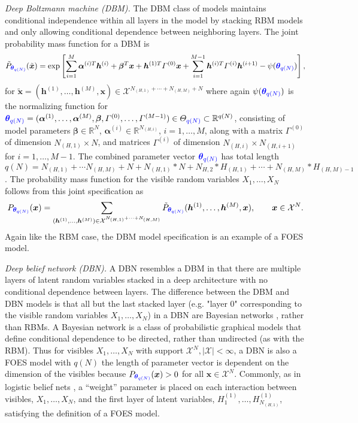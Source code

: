 \documentclass[numbib]{imamat}
\theoremstyle{theorem}
\theoremstyle{lemma}
\theoremstyle{example}
\theoremstyle{corollary}
\theoremstyle{definition}
\theoremstyle{remark}
\theoremstyle{approximation}
\theoremstyle{scheme}
\newcommand{\thetaidx}{q(N)}
\newcommand{\thetaN}{\boldsymbol \theta_{\thetaidx}}
\newcommand{\ak}[1]{{\color{blue} #1}}
\begin{document}
\noindent \emph{Deep Boltzmann machine (DBM).} The DBM class of models maintains conditional independence within all layers in the model by stacking RBM models and only allowing conditional dependence between neighboring layers. The joint probability mass function for a DBM is
\[
\tilde{P}_{\ak{\thetaN}} ( \tilde{\boldsymbol x} ) = \exp\left[ \sum\limits_{i = 1}^M\boldsymbol \alpha^{(i)T} \boldsymbol h^{(i)} + \boldsymbol \beta^T \boldsymbol x + \boldsymbol h^{(1)T} \Gamma^{(0)} \boldsymbol x + \sum\limits_{i = 1}^{M - 1} \boldsymbol h^{(i)T} \Gamma^{(i)} \boldsymbol h^{(i + 1)} - \psi(\ak{\thetaN}) \right],
\]
for \(\tilde{\boldsymbol x} = (\boldsymbol h^{(1)}, \dots, \boldsymbol h^{(M)}, \boldsymbol x) \in \mathcal{X}^{N_{(H,1)} + \cdots + N_{(H,M)} +N}\) \ak{where again $\psi(\ak{\thetaN})$}
is the normalizing function for \(\ak{\thetaN} = (\boldsymbol \alpha^{(1)}, \dots, \boldsymbol \alpha^{(M)}, \boldsymbol \beta,\Gamma^{(0)}, \dots, \Gamma^{(M - 1)}) \in \Theta_\ak{\thetaidx} \subset \mathbb{R}^{q(N)}\), consisting of model parameters \(\boldsymbol \beta \in \mathbb{R}^N\), \(\boldsymbol \alpha^{(i)} \in \mathbb{R}^{N_{(H,i)}}\), \(i = 1, \dots, M\), along with a matrix \(\Gamma^{(0)}\) of dimension \(N_{(H,1)} \times N\), and matrices \(\Gamma^{(i)}\) of dimension
\(N_{(H,i)} \times N_{(H,i+1)}\) for \(i = 1, \dots, M-1\). The combined parameter vector \(\ak{\thetaN}\) has total length \(q(N)= N_{(H,1)}+\cdots N_{(H,M)} + N + N_{(H,1)}*N+N_{H,2}*H_{(H,1)}+\cdots +N_{(H,M)}*H_{(H,M)-1}\). The probability mass function for the visible random variables \(X_1, \dots, X_N\) follows from this joint specification as
\[
P_{\ak{\thetaN}} (\boldsymbol x) = \sum\limits_{(\boldsymbol h^{(1)}, \dots, \boldsymbol h^{(M)}) \in \mathcal{X}^{N_{(H,1)} + \cdots + N_{(H,M)}}} \tilde{P}_{\ak{\thetaN}} (\boldsymbol h^{(1)}, \dots, \boldsymbol h^{(M)}, \boldsymbol x) , \qquad \boldsymbol x \in \mathcal{X}^N.
\]
Again like the RBM case, the DBM model specification is an example of a FOES model.

\noindent \emph{Deep belief network (DBN).} A DBN resembles a DBM in that there are multiple layers of latent random variables stacked in a deep architecture with no conditional dependence between layers. The difference between the DBM and DBN models is that all but the last stacked layer \ak{(e.g. "layer $0$" corresponding to the visible random variables $X_1, \dots, X_N$)} in a DBN are Bayesian networks \citep[see][]{pearl985bayesian}, rather than RBMs. A Bayesian network \ak{is a class of probabilistic graphical models that define} conditional dependence to be directed, rather than undirected (as with the RBM). Thus for visibles \(X_1, \dots, X_N\) with support \(\mathcal{X}^N, \mid \mathcal{X} \mid < \infty\), a DBN is also a FOES model with \(q(N)\) the length of parameter vector is dependent on the dimension of the visibles because \(P_{\ak{\thetaN}}(\boldsymbol x)>0\) for all \(\boldsymbol x \in\mathcal{X}^N\). Commonly, as in logistic belief nets \citep{neal1992connectionist}, a ``weight'' parameter is placed on each interaction between visibles, \(X_1, \dots, X_N\), and the first layer of latent variables, \(H^{(1)}_1, \dots, H^{(1)}_{N_{(H,1)}}\), satisfying the definition of a FOES model.
\end{document}
